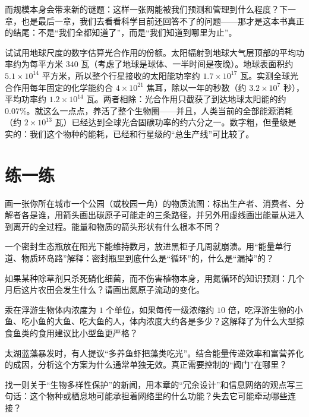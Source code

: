 而规模本身会带来新的谜题：这样一张网能被我们预测和管理到什么程度？下一章，也是最后一章，我们去看看科学目前还回答不了的问题——那才是这本书真正的结尾：不是“我们全都知道了”，而是“我们知道到哪里为止”。

\begin{tiaozhan}
试试用地球尺度的数字估算光合作用的份额。太阳辐射到地球大气层顶部的平均功率约为每平方米 $340$ 瓦（考虑了地球是球体、一半时间是夜晚）。地球表面积约 $5.1\times 10^{14}$ 平方米，所以整个行星接收的太阳能功率约 $1.7\times 10^{17}$ 瓦。实测全球光合作用每年固定的化学能约合 $4\times 10^{21}$ 焦耳，除以一年的秒数（约 $3.2\times 10^7$ 秒），平均功率约 $1.2\times 10^{14}$ 瓦。两者相除：光合作用只截获了到达地球太阳能的约 $0.07\%$。就这么一点点，养活了整个生物圈——并且，人类当前的全部能源消耗（约 $2\times 10^{13}$ 瓦）已经达到全球光合固碳功率的约六分之一。数字粗，但量级是实的：我们这个物种的能耗，已经和行星级的“总生产线”可比较了。
\end{tiaozhan}

\section*{练一练}

\begin{sikaoti}
\item 画一张你所在城市一个公园（或校园一角）的物质流图：标出生产者、消费者、分解者各是谁，用箭头画出碳原子可能走的三条路径，并另外用虚线画出能量从进入到离开的全过程。能量和物质的箭头形状有什么根本不同？
\item 一个密封生态瓶放在阳光下能维持数月，放进黑柜子几周就崩溃。用“能量单行道、物质环岛路”解释：密封瓶里到底什么是“循环”的，什么是“漏掉”的？
\item 如果某种除草剂只杀死硝化细菌，而不伤害植物本身，用氮循环的知识预测：几个月后这片农田会发生什么？请画出氮原子流动的变化。
\item 汞在浮游生物体内浓度为 $1$ 个单位，如果每传一级浓缩约 $10$ 倍，吃浮游生物的小鱼、吃小鱼的大鱼、吃大鱼的人，体内浓度大约各是多少？这解释了为什么大型掠食鱼类的食用建议比小型鱼更严格？
\item 太湖蓝藻暴发时，有人提议“多养鱼虾把藻类吃光”。结合能量传递效率和富营养化的成因，分析这个方案为什么通常单独无效。真正需要控制的“阀门”在哪里？
\item 找一则关于“生物多样性保护”的新闻，用本章的“冗余设计”和信息网络的观点写三句话：这个物种或栖息地可能承担着网络里的什么功能？失去它可能牵动哪些连接？
\end{sikaoti}

